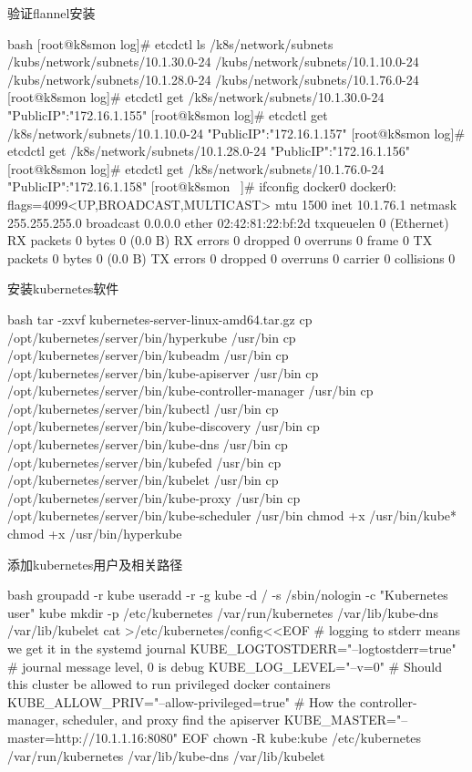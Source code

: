 \begin{outline}[enumerate]
  \1 验证flannel安装
\begin{code-in-enumerate}{bash}
[root@k8smon log]# etcdctl ls /k8s/network/subnets
/kubs/network/subnets/10.1.30.0-24
/kubs/network/subnets/10.1.10.0-24
/kubs/network/subnets/10.1.28.0-24
/kubs/network/subnets/10.1.76.0-24
[root@k8smon log]# etcdctl get /k8s/network/subnets/10.1.30.0-24
{"PublicIP":"172.16.1.155"}
[root@k8smon log]# etcdctl get /k8s/network/subnets/10.1.10.0-24
{"PublicIP":"172.16.1.157"}
[root@k8smon log]# etcdctl get /k8s/network/subnets/10.1.28.0-24
{"PublicIP":"172.16.1.156"}
[root@k8smon log]# etcdctl get /k8s/network/subnets/10.1.76.0-24
{"PublicIP":"172.16.1.158"}
[root@k8smon ~]# ifconfig docker0
docker0: flags=4099<UP,BROADCAST,MULTICAST>  mtu 1500
        inet 10.1.76.1  netmask 255.255.255.0  broadcast 0.0.0.0
        ether 02:42:81:22:bf:2d  txqueuelen 0  (Ethernet)
        RX packets 0  bytes 0 (0.0 B)
        RX errors 0  dropped 0  overruns 0  frame 0
        TX packets 0  bytes 0 (0.0 B)
        TX errors 0  dropped 0 overruns 0  carrier 0  collisions 0
\end{code-in-enumerate}

  \1 安装kubernetes软件
\begin{code-in-enumerate}{bash}
tar -zxvf kubernetes-server-linux-amd64.tar.gz
cp /opt/kubernetes/server/bin/hyperkube /usr/bin
cp /opt/kubernetes/server/bin/kubeadm /usr/bin
cp /opt/kubernetes/server/bin/kube-apiserver /usr/bin
cp /opt/kubernetes/server/bin/kube-controller-manager /usr/bin
cp /opt/kubernetes/server/bin/kubectl /usr/bin
cp /opt/kubernetes/server/bin/kube-discovery /usr/bin
cp /opt/kubernetes/server/bin/kube-dns /usr/bin
cp /opt/kubernetes/server/bin/kubefed /usr/bin
cp /opt/kubernetes/server/bin/kubelet /usr/bin
cp /opt/kubernetes/server/bin/kube-proxy /usr/bin
cp /opt/kubernetes/server/bin/kube-scheduler /usr/bin
chmod +x /usr/bin/kube*
chmod +x /usr/bin/hyperkube
\end{code-in-enumerate}

  \1 添加kubernetes用户及相关路径
\begin{code-in-enumerate}{bash}
groupadd -r kube
useradd -r -g kube -d / -s /sbin/nologin -c "Kubernetes user" kube
mkdir -p /etc/kubernetes /var/run/kubernetes /var/lib/kube-dns /var/lib/kubelet
cat >/etc/kubernetes/config<<EOF
# logging to stderr means we get it in the systemd journal
KUBE_LOGTOSTDERR="--logtostderr=true"
# journal message level, 0 is debug
KUBE_LOG_LEVEL="--v=0"
# Should this cluster be allowed to run privileged docker containers
KUBE_ALLOW_PRIV="--allow-privileged=true"
# How the controller-manager, scheduler, and proxy find the apiserver
KUBE_MASTER="--master=http://10.1.1.16:8080"
EOF
chown -R kube:kube /etc/kubernetes /var/run/kubernetes /var/lib/kube-dns /var/lib/kubelet
\end{code-in-enumerate}

\end{outline}

